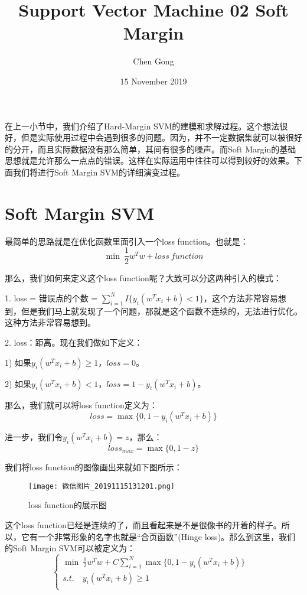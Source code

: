 \documentclass[a4paper]{article}
\title{Support Vector Machine 02 Soft Margin}
\author{Chen Gong}
\date{15 November 2019}
\begin{document}
\maketitle

在上一小节中，我们介绍了Hard-Margin SVM的建模和求解过程。这个想法很好，但是实际使用过程中会遇到很多的问题。因为，并不一定数据集就可以被很好的分开，而且实际数据没有那么简单，其间有很多的噪声。而Soft Margin的基础思想就是允许那么一点点的错误。这样在实际运用中往往可以得到较好的效果。下面我们将进行Soft Margin SVM的详细演变过程。

\section{Soft Margin SVM}
最简单的思路就是在优化函数里面引入一个loss function。也就是：
\begin{equation}
    \min \ \frac{1}{2}w^Tw + loss \ function
\end{equation}

那么，我们如何来定义这个loss function呢？大致可以分这两种引入的模式：

1. loss = 错误点的个数 = $\sum_{i=1}^NI\{y_i(w^Tx_i+b)<1\}$，这个方法非常容易想到，但是我们马上就发现了一个问题，那就是这个函数不连续的，无法进行优化。这种方法非常容易想到。

2. loss：距离。现在我们做如下定义：

1) 如果$y_i(w^Tx_i+b)\geq 1$，$loss = 0$。

2) 如果$y_i(w^Tx_i+b)< 1$，$loss = 1-y_i(w^Tx_i+b)$。

那么，我们就可以将loss function定义为：
\begin{equation}
    loss = \max\{ 0, 1-y_i(w^Tx_i+b) \}
\end{equation}

进一步，我们令$y_i(w^Tx_i+b)=z$，那么：
\begin{equation}
    loss_{max} = \max\{ 0, 1-z \}
\end{equation}

我们将loss function的图像画出来就如下图所示：
\begin{figure}[H]
    \centering
    \texttt{[image: 微信图片\_20191115131201.png]}
    \caption{loss function的展示图}
    \label{fig:my_label_1}
\end{figure}

这个loss function已经是连续的了，而且看起来是不是很像书的开着的样子。所以，它有一个非常形象的名字也就是“合页函数”(Hinge loss)。那么到这里，我们的Soft Margin SVM可以被定义为：
\begin{equation}
    \left\{
        \begin{array}{ll}
        \min \ \frac{1}{2}w^Tw + C\sum_{i=1}^N\max\{ 0, 1-y_i(w^Tx_i+b) \}  & \\
        s.t.\quad y_i(w^Tx_i + b) \geq 1 & \\
    \end{array}
    \right.
\end{equation}
\end{document}
